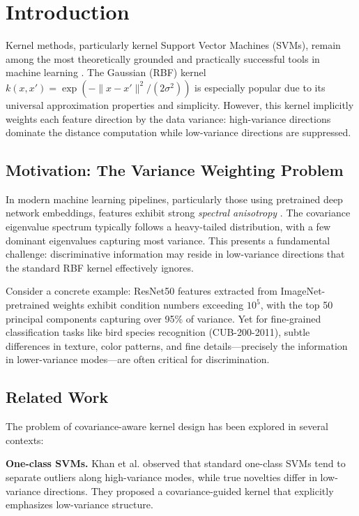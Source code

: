 \documentclass[11pt]{article}
\begin{document}
\section{Introduction}

Kernel methods, particularly kernel Support Vector Machines (SVMs), remain among the most theoretically grounded and practically successful tools in machine learning \cite{scholkopf2002learning}. The Gaussian (RBF) kernel $k(x,x') = \exp(-\|x-x'\|^2/(2\sigma^2))$ is especially popular due to its universal approximation properties and simplicity. However, this kernel implicitly weights each feature direction by the data variance: high-variance directions dominate the distance computation while low-variance directions are suppressed.

\subsection{Motivation: The Variance Weighting Problem}

In modern machine learning pipelines, particularly those using pretrained deep network embeddings, features exhibit strong \emph{spectral anisotropy} \cite{papyan2020prevalence}. The covariance eigenvalue spectrum typically follows a heavy-tailed distribution, with a few dominant eigenvalues capturing most variance. This presents a fundamental challenge: discriminative information may reside in low-variance directions that the standard RBF kernel effectively ignores.

Consider a concrete example: ResNet50 features extracted from ImageNet-pretrained weights exhibit condition numbers exceeding $10^5$, with the top 50 principal components capturing over 95\% of variance. Yet for fine-grained classification tasks like bird species recognition (CUB-200-2011), subtle differences in texture, color patterns, and fine details---precisely the information in lower-variance modes---are often critical for discrimination.

\subsection{Related Work}

The problem of covariance-aware kernel design has been explored in several contexts:

\textbf{One-class SVMs.} Khan et al. \cite{khan2014covariance} observed that standard one-class SVMs tend to separate outliers along high-variance modes, while true novelties differ in low-variance directions. They proposed a covariance-guided kernel that explicitly emphasizes low-variance structure.
\end{document}
